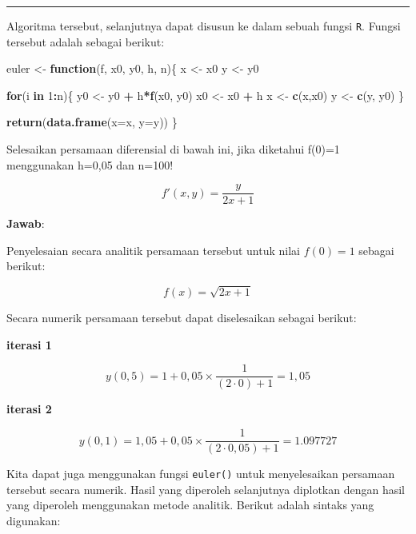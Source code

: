 \documentclass[]{book}
\newenvironment{Shaded}{\begin{snugshade}}{\end{snugshade}}
\newcommand{\ControlFlowTok}[1]{\textcolor[rgb]{0.13,0.29,0.53}{\textbf{#1}}}
\newcommand{\DataTypeTok}[1]{\textcolor[rgb]{0.13,0.29,0.53}{#1}}
\newcommand{\DecValTok}[1]{\textcolor[rgb]{0.00,0.00,0.81}{#1}}
\newcommand{\KeywordTok}[1]{\textcolor[rgb]{0.13,0.29,0.53}{\textbf{#1}}}
\newcommand{\NormalTok}[1]{#1}
\newcommand{\OperatorTok}[1]{\textcolor[rgb]{0.81,0.36,0.00}{\textbf{#1}}}
\newcommand{\StringTok}[1]{\textcolor[rgb]{0.31,0.60,0.02}{#1}}
\theoremstyle{definition}
\theoremstyle{definition}
\theoremstyle{definition}
\theoremstyle{remark}
\let\BeginKnitrBlock\begin \let\EndKnitrBlock\end
\begin{document}
\begin{center}\rule{0.5\linewidth}{\linethickness}\end{center}

Algoritma tersebut, selanjutnya dapat disusun ke dalam sebuah fungsi \texttt{R}. Fungsi tersebut adalah sebagai berikut:

\begin{Shaded}
\begin{Highlighting}[]
\NormalTok{euler <-}\StringTok{ }\ControlFlowTok{function}\NormalTok{(f, x0, y0, h, n)\{}
\NormalTok{  x <-}\StringTok{ }\NormalTok{x0}
\NormalTok{  y <-}\StringTok{ }\NormalTok{y0}
  
  \ControlFlowTok{for}\NormalTok{(i }\ControlFlowTok{in} \DecValTok{1}\OperatorTok{:}\NormalTok{n)\{}
\NormalTok{    y0 <-}\StringTok{ }\NormalTok{y0 }\OperatorTok{+}\StringTok{ }\NormalTok{h}\OperatorTok{*}\KeywordTok{f}\NormalTok{(x0, y0)}
\NormalTok{    x0 <-}\StringTok{ }\NormalTok{x0 }\OperatorTok{+}\StringTok{ }\NormalTok{h}
\NormalTok{    x <-}\StringTok{ }\KeywordTok{c}\NormalTok{(x,x0)}
\NormalTok{    y <-}\StringTok{ }\KeywordTok{c}\NormalTok{(y, y0)}
\NormalTok{  \}}
  
  \KeywordTok{return}\NormalTok{(}\KeywordTok{data.frame}\NormalTok{(}\DataTypeTok{x=}\NormalTok{x, }\DataTypeTok{y=}\NormalTok{y))}
\NormalTok{\}}
\end{Highlighting}
\end{Shaded}

\BeginKnitrBlock{example}
\protect\hypertarget{exm:eulerexmp}{}{\label{exm:eulerexmp} }Selesaikan persamaan diferensial di bawah ini, jika diketahui f(0)=1 menggunakan h=0,05 dan n=100!
\EndKnitrBlock{example}

\[
f'\left(x,y\right)=\frac{y}{2x+1}
\]

\textbf{Jawab}:

Penyelesaian secara analitik persamaan tersebut untuk nilai \(f\left(0\right)=1\) sebagai berikut:

\[
f\left(x\right)=\sqrt{2x+1}
\]

Secara numerik persamaan tersebut dapat diselesaikan sebagai berikut:

\textbf{iterasi 1}

\[
y\left(0,5\right)=1+0,05\times\frac{1}{\left(2\cdot 0\right)+1}=1,05
\]

\textbf{iterasi 2}

\[
y\left(0,1\right)=1,05+0,05\times\frac{1}{\left(2\cdot0,05\right)+1}=1.097727
\]

Kita dapat juga menggunakan fungsi \texttt{euler()} untuk menyelesaikan persamaan tersebut secara numerik. Hasil yang diperoleh selanjutnya diplotkan dengan hasil yang diperoleh menggunakan metode analitik. Berikut adalah sintaks yang digunakan:
\end{document}

